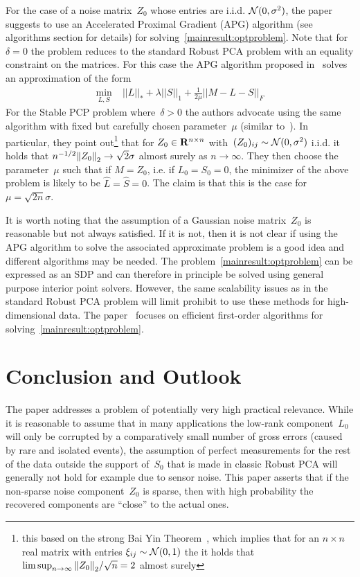 \documentclass{article}
\begin{document}
For the case of a noise matrix~$Z_0$ whose entries are i.i.d. ${\mathcal{N}}(0,\sigma^2)$, the paper suggests to use an Accelerated Proximal Gradient (APG) algorithm (see algorithms section for details) for solving~\eqref{mainresult:optproblem}. Note that for~$\delta =0$ the problem reduces to the standard Robust PCA problem with an equality constraint on the matrices. For this case the APG algorithm proposed in~\cite{Lin:2009kx} solves an approximation of the form
\begin{align*}
\min_{L,S} \; &||L||_* + \lambda ||S||_1 + \frac{1}{2\mu} ||M-L-S||_F
\end{align*}
For the Stable PCP problem where~$\delta>0$ the authors advocate using the same algorithm with fixed but carefully chosen parameter~$\mu$ (similar to~\cite{Candes:2010fk}). In particular, they point out\footnote{this based on the strong Bai Yin Theorem~\cite{Bai:1988fk}, which implies that for an $n\times n$ real matrix with entries $\xi_{ij} \sim {\mathcal{N}}(0,1)$ the it holds that $\limsup_{n\rightarrow \infty} {\left\|Z_0\right\|}_{2}^{}/\sqrt{n} = 2$ almost surely}
 that for $Z_0 \in{\mathbf R}^{n\times n}$ with~$(Z_0)_{ij} \sim {\mathcal{N}}(0,\sigma^2)$ i.i.d. it holds that $n^{-1/2}{\left\|Z_0\right\|}_{2}^{} \rightarrow \sqrt{2}\sigma$ almost surely as $n\rightarrow\infty$. They then choose the parameter~$\mu$ such that if $M=Z_0$, i.e. if $L_0=S_0=0$, the minimizer of the above problem is likely to be $\hat{L}=\hat{S}=0$. The claim is that this is the case for~$\mu = \sqrt{2n}\sigma$.
  
It is worth noting that the assumption of a Gaussian noise matrix~$Z_0$ is reasonable but not always satisfied. If it is not, then it is not clear if using the APG algorithm to solve the associated approximate problem is a good idea and different algorithms may be needed. The problem~\eqref{mainresult:optproblem} can be expressed as an SDP and can therefore in principle be solved using general purpose interior point solvers. However, the same scalability issues as in the standard Robust PCA problem will limit prohibit to use these methods for high-dimensional data. The paper~\cite{Aybat:2011vn} focuses on efficient first-order algorithms for solving~\eqref{mainresult:optproblem}.


\section{Conclusion and Outlook}

The paper addresses a problem of potentially very high practical relevance. While it is reasonable to assume that in many applications the low-rank component~$L_0$ will only be corrupted by a comparatively small number of gross errors (caused by rare and isolated events), the assumption of perfect measurements for the rest of the data outside the support of~$S_0$ that is made in classic Robust PCA will generally not hold for example due to sensor noise. This paper asserts that if the non-sparse noise component~$Z_0$ is sparse, then with high probability the recovered components are ``close'' to the actual ones. 
\end{document}
